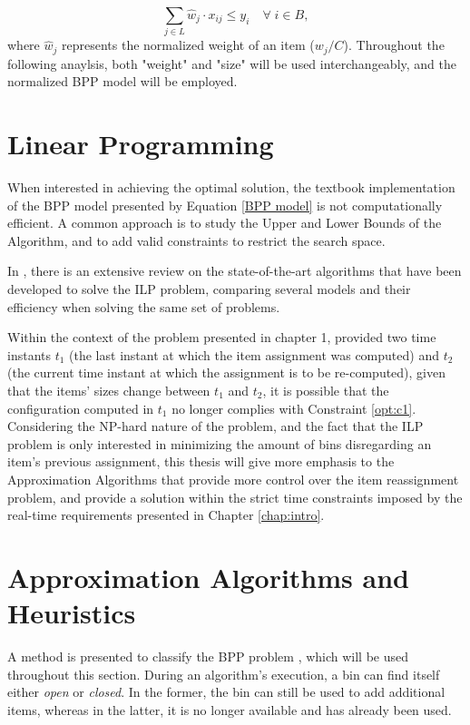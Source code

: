 \begin{equation}
    \sum_{j \in L} \hat w_j \cdot x_{ij} \leq y_i \quad \forall \; i \in B,
\end{equation}
where \(\hat w_j\) represents the normalized weight of an item ($w_j/C$).
Throughout the following anaylsis, both "weight" and "size" will be used
interchangeably, and the normalized BPP model will be employed.

\section{Linear Programming}

When interested in achieving the optimal solution, the textbook implementation
of the BPP model presented by Equation \ref{BPP model} is not computationally
efficient. A common approach is to study the Upper and Lower Bounds of the
Algorithm, and to add valid constraints to restrict the search space.

In \cite{delorme2016bin}, there is an extensive review on the state-of-the-art
algorithms that have been developed to solve the ILP problem, comparing several
models and their efficiency when solving the same set of problems. 

Within the context of the problem presented in chapter 1, provided two time
instants $t_1$ (the last instant at which the item assignment was computed) and
$t_2$ (the current time instant at which the assignment is to be re-computed),
given that the items' sizes change between $t_1$ and $t_2$, it is possible that
the configuration computed in $t_1$ no longer complies with Constraint
\ref{opt:c1}. Considering the NP-hard nature of the problem, and the fact that the
ILP problem is only interested in minimizing the amount of bins disregarding an
item's previous assignment, this thesis will give more emphasis to the
Approximation Algorithms that provide more control over the item reassignment
problem, and provide a solution within the strict time constraints imposed by
the real-time requirements presented in Chapter \ref{chap:intro}.

\section{Approximation Algorithms and Heuristics}
\label{section:AA}

A method is presented to classify the BPP problem \cite{coffman2013bin}, which
will be used throughout this section. During an algorithm's execution, a bin can
find itself either \textit{open} or \textit{closed}. In the former, the bin can
still be used to add additional items, whereas in the latter, it is no longer
available and has already been used.  

